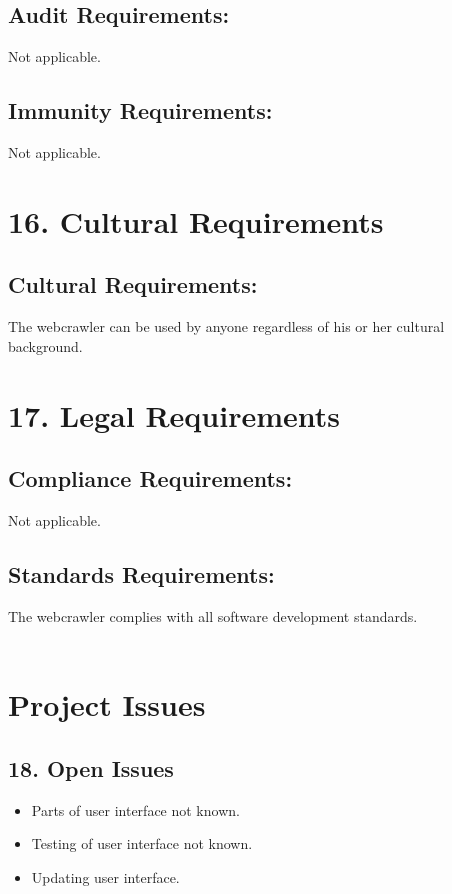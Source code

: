 \documentclass[12pt]{article}
\begin{document}
\subsection{Audit Requirements:}
Not applicable.

\subsection{Immunity Requirements:}
Not applicable.

\section{16. Cultural Requirements}

\subsection{Cultural Requirements:}

The webcrawler can be used by anyone regardless of his or her cultural background.

\section{17. Legal Requirements }

\subsection{Compliance Requirements:}

Not applicable.

\subsection{Standards Requirements:}

The webcrawler complies with all software development standards.\\
\\

\section{Project Issues}

\subsection{18. Open Issues }

\begin{itemize}
  \item Parts of user interface not known.
  \item Testing of user interface not known.
  \item Updating user interface.
\end{itemize}
\end{document}
